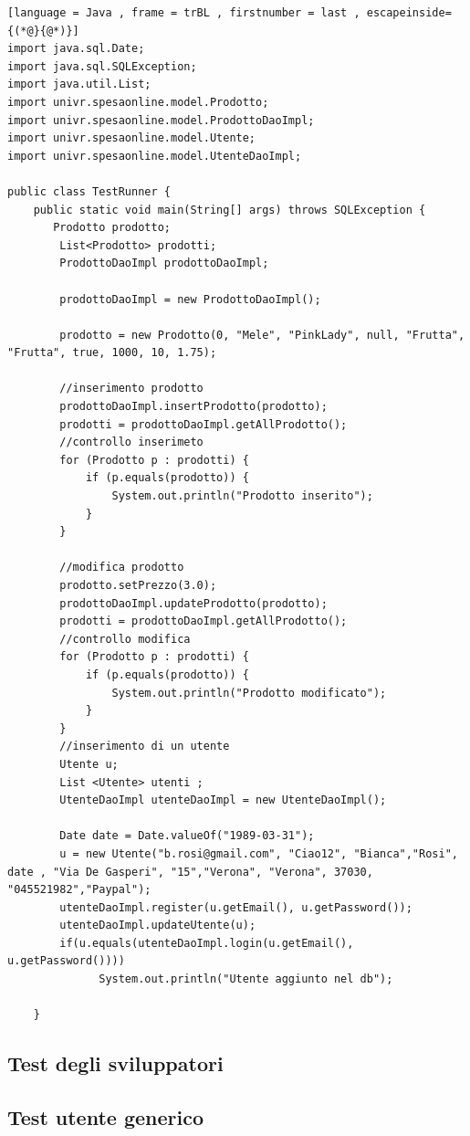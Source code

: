 \documentclass{article}
\begin{document}
\begin{lstlisting}[language = Java , frame = trBL , firstnumber = last , escapeinside={(*@}{@*)}]
import java.sql.Date;
import java.sql.SQLException;
import java.util.List;
import univr.spesaonline.model.Prodotto;
import univr.spesaonline.model.ProdottoDaoImpl;
import univr.spesaonline.model.Utente;
import univr.spesaonline.model.UtenteDaoImpl;

public class TestRunner {
    public static void main(String[] args) throws SQLException {
       Prodotto prodotto;
        List<Prodotto> prodotti;
        ProdottoDaoImpl prodottoDaoImpl;

        prodottoDaoImpl = new ProdottoDaoImpl();

        prodotto = new Prodotto(0, "Mele", "PinkLady", null, "Frutta", "Frutta", true, 1000, 10, 1.75);

        //inserimento prodotto 
        prodottoDaoImpl.insertProdotto(prodotto);
        prodotti = prodottoDaoImpl.getAllProdotto();
        //controllo inserimeto
        for (Prodotto p : prodotti) {
            if (p.equals(prodotto)) {
                System.out.println("Prodotto inserito");
            }
        }

        //modifica prodotto
        prodotto.setPrezzo(3.0);
        prodottoDaoImpl.updateProdotto(prodotto);
        prodotti = prodottoDaoImpl.getAllProdotto();
        //controllo modifica
        for (Prodotto p : prodotti) {
            if (p.equals(prodotto)) {
                System.out.println("Prodotto modificato");
            }
        }
        //inserimento di un utente
        Utente u;
        List <Utente> utenti ;
        UtenteDaoImpl utenteDaoImpl = new UtenteDaoImpl();
       
        Date date = Date.valueOf("1989-03-31");
        u = new Utente("b.rosi@gmail.com", "Ciao12", "Bianca","Rosi", date , "Via De Gasperi", "15","Verona", "Verona", 37030, "045521982","Paypal");
        utenteDaoImpl.register(u.getEmail(), u.getPassword());
        utenteDaoImpl.updateUtente(u);
        if(u.equals(utenteDaoImpl.login(u.getEmail(), u.getPassword())))
              System.out.println("Utente aggiunto nel db");
        
    }
\end{lstlisting}

\subsection{Test degli sviluppatori}
\subsection{Test utente generico}
\end{document}
